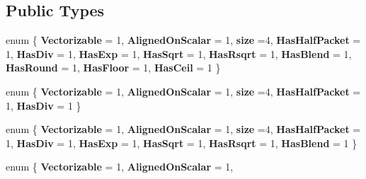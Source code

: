 \subsection*{Public Types}
\begin{DoxyCompactItemize}
\item 
\mbox{\label{struct_eigen_1_1internal_1_1packet__traits_3_01double_01_4_a5d09f023114ce21ddf80e3fc3a313e9c}} 
enum \{ \newline
{\bfseries Vectorizable} = 1, 
{\bfseries Aligned\+On\+Scalar} = 1, 
{\bfseries size} =4, 
{\bfseries Has\+Half\+Packet} = 1, 
\newline
{\bfseries Has\+Div} = 1, 
{\bfseries Has\+Exp} = 1, 
{\bfseries Has\+Sqrt} = 1, 
{\bfseries Has\+Rsqrt} = 1, 
\newline
{\bfseries Has\+Blend} = 1, 
{\bfseries Has\+Round} = 1, 
{\bfseries Has\+Floor} = 1, 
{\bfseries Has\+Ceil} = 1
 \}
\item 
\mbox{\label{struct_eigen_1_1internal_1_1packet__traits_3_01double_01_4_a5b901bf09a40f140e19d8f08614a8a6e}} 
enum \{ \newline
{\bfseries Vectorizable} = 1, 
{\bfseries Aligned\+On\+Scalar} = 1, 
{\bfseries size} =4, 
{\bfseries Has\+Half\+Packet} = 1, 
\newline
{\bfseries Has\+Div} = 1
 \}
\item 
\mbox{\label{struct_eigen_1_1internal_1_1packet__traits_3_01double_01_4_a40bbaab8f2e4bacc8256b97fb3a71729}} 
enum \{ \newline
{\bfseries Vectorizable} = 1, 
{\bfseries Aligned\+On\+Scalar} = 1, 
{\bfseries size} =4, 
{\bfseries Has\+Half\+Packet} = 1, 
\newline
{\bfseries Has\+Div} = 1, 
{\bfseries Has\+Exp} = 1, 
{\bfseries Has\+Sqrt} = 1, 
{\bfseries Has\+Rsqrt} = 1, 
\newline
{\bfseries Has\+Blend} = 1
 \}
\item 
\mbox{\label{struct_eigen_1_1internal_1_1packet__traits_3_01double_01_4_a2cf07b3a2b031aa2ebdd9fb8dcf13b1f}} 
enum \{ \newline
{\bfseries Vectorizable} = 1, 
{\bfseries Aligned\+On\+Scalar} = 1, 

\end{DoxyCompactItemize}

